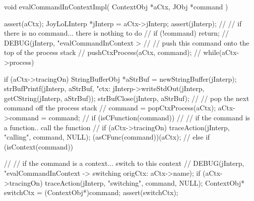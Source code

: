 \startCCode
void evalCommandInContextImpl(
  ContextObj *aCtx,
  JObj   *command
) {
  assert(aCtx);
  JoyLoLInterp *jInterp = aCtx->jInterp;
  assert(jInterp);
  //
  // if there is no command... there is nothing to do
  //
  if (!command) return;
  //
  DEBUG(jInterp, "evalCommandInContext > %
  //
  // push this command onto the top of the process stack
  //
  pushCtxProcess(aCtx, command);
  //
  while(aCtx->process) {
    if (aCtx->tracingOn) {
      StringBufferObj *aStrBuf = 
        newStringBuffer(jInterp);
      strBufPrintf(jInterp, aStrBuf, "\n ctx: %
      jInterp->writeStdOut(jInterp, getCString(jInterp, aStrBuf));
      strBufClose(jInterp, aStrBuf);
    }
    //
    // pop the next command off the process stack
    //
    command = popCtxProcess(aCtx);
    aCtx->command = command;
    //
    if (isCFunction(command)) {
      //
      // if the command is a function.. call the function
      //
      if (aCtx->tracingOn) 
        traceAction(jInterp, "calling", command, NULL);
      (asCFunc(command))(aCtx);
      //
    } else if (isContext(command)) {
      //
      // if the command is a context... switch to this context
      //
      DEBUG(jInterp, "evalCommandInContext -> switching origCtx: %
            aCtx->name);
      if (aCtx->tracingOn)
        traceAction(jInterp, "switching", command, NULL);
      ContextObj* switchCtx = (ContextObj*)command;
      assert(switchCtx);

}}}
